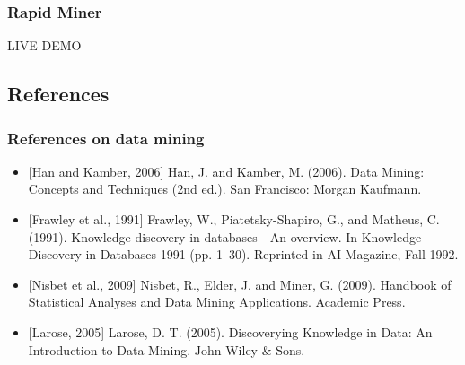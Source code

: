 
\begin{frame}
\frametitle{Rapid Miner}

\begin{center}
 \begin{LARGE} LIVE DEMO \end{LARGE}
\end{center}


\end{frame}



% 
% 

\subsection{References}


\begin{frame}
\frametitle{References on data mining}

\begin{itemize}
 \item \small [Han and Kamber, 2006] Han, J. and Kamber, M. (2006). Data Mining: Concepts and Techniques (2nd ed.). 
 San Francisco: Morgan Kaufmann.
 \item \small [Frawley et al., 1991] Frawley, W., Piatetsky-Shapiro, G., and Matheus, C. (1991). Knowledge discovery 
in databases—An overview. In Knowledge Discovery in Databases 1991 (pp. 1–30). Reprinted in AI Magazine, Fall 1992.
 \item \small [Nisbet et al., 2009] Nisbet, R., Elder, J. and Miner, G. (2009). Handbook of Statistical Analyses and
Data Mining Applications. Academic Press.
 \item \small [Larose, 2005] Larose, D. T. (2005). Discoverying Knowledge in Data: An Introduction to Data Mining.
John Wiley \& Sons.

 \end{itemize}
\end{frame}

